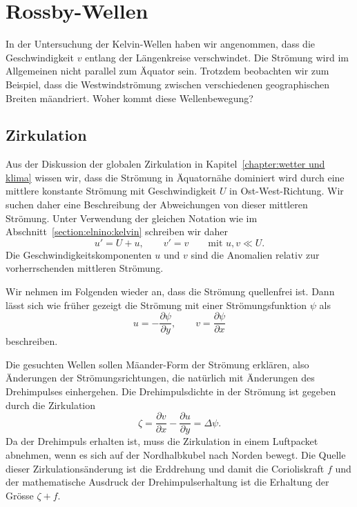 %
%
%

\section{Rossby-Wellen\label{section:elnino:rossby}}
In der Untersuchung der Kelvin-Wellen haben wir angenommen, dass die
Geschwindigkeit $v$ entlang der Längenkreise verschwindet.
Die Strömung wird im Allgemeinen nicht parallel zum Äquator sein.
Trotzdem beobachten wir zum Beispiel, dass die Westwindströmung 
zwischen verschiedenen geographischen Breiten mäandriert.
Woher kommt diese Wellenbewegung?

\subsection{Zirkulation\label{subsection:rossby:zirkulation}}
Aus der Diskussion der globalen Zirkulation in
Kapitel~\ref{chapter:wetter und klima} wissen wir, dass die
Strömung in Äquatornähe dominiert wird durch eine mittlere
konstante Strömung mit Geschwindigkeit $U$ in Ost-West-Richtung.
Wir suchen daher eine Beschreibung der Abweichungen von dieser
mittleren Strömung.
Unter Verwendung der gleichen Notation wie im
Abschnitt~\ref{section:elnino:kelvin} schreiben wir daher
\[
u'=U+u,\qquad v'=v\qquad\text{mit $u,v\ll U$}.
\]
Die Geschwindigkeitskomponenten $u$ und $v$ sind die Anomalien relativ
zur vorherrschenden mittleren Strömung.

Wir nehmen im Folgenden wieder an, dass die Strömung quellenfrei ist.
Dann lässt sich wie früher gezeigt die Strömung mit einer
Strömungsfunktion $\psi$ als
\begin{equation}
u=-\frac{\partial \psi}{\partial y},\qquad
v=\frac{\partial\psi}{\partial x}
\label{skript:rossby:geschwindigkeit}
\end{equation}
beschreiben.

Die gesuchten Wellen sollen Mäander-Form der Strömung erklären,
also Änderungen der Strömungsrichtungen, die natürlich mit
Änderungen des Drehimpulses einhergehen.
Die Drehimpulsdichte in der Strömung ist gegeben durch die Zirkulation
\[
\zeta
=
\frac{\partial v}{\partial x} - \frac{\partial u}{\partial y}
=
\Delta \psi.
\]
Da der Drehimpuls erhalten ist, muss die Zirkulation in einem
Luftpacket abnehmen, wenn es sich auf der Nordhalbkubel nach Norden
bewegt.
Die Quelle dieser Zirkulationsänderung ist die Erddrehung und damit
die Corioliskraft $f$ und der mathematische Ausdruck der Drehimpulserhaltung
ist die Erhaltung der Grösse $\zeta+f$.

